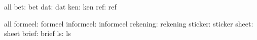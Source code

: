 \stopvariables




\startconstants       all
                bet:  bet
                dat:  dat
                ken:  ken
                ref:  ref
\stopconstants

\startvariables       all
            formeel:  formeel
          informeel:  informeel
           rekening:  rekening
            sticker:  sticker
              sheet:  sheet
              brief:  brief
                 ls:  ls
\stopvariables


\stoplogginginterface

\endinput
